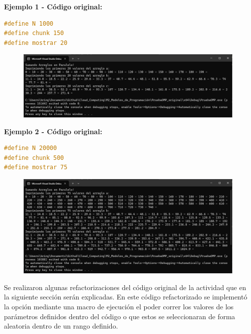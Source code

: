 \documentclass[12pt,a4paper]{article}
\begin{document}
\vspace{1em}

\textbf{Ejemplo 1 - Código original:}

\begin{lstlisting}[language=C, numbers=none]
#define N 1000
#define chunk 150
#define mostrar 20
\end{lstlisting}

\begin{figure}[H]
    \centering
    \includegraphics[width=1\linewidth]{M2_Modelos_de_Programación/reporte/figuras/Código_original_ejemplo-1.png}
    \label{fig:Código_original_ejemplo-1}
\end{figure}

\textbf{Ejemplo 2 - Código original:}

\begin{lstlisting}[language=C, numbers=none]
#define N 20000
#define chunk 500
#define mostrar 75
\end{lstlisting}

\begin{figure}[H]
    \centering
    \includegraphics[width=1\linewidth]{M2_Modelos_de_Programación/reporte/figuras/Código_original_ejemplo-2.png}
    \label{fig:Código_original_ejemplo-2}
\end{figure}

Se realizaron algunas refactorizaciones del código original de la actividad que en la siguiente sección serán explicadas. En este código refactorizado se implementó la opción mediante una macro de ejecución el poder correr los valores de los parámetros definidos dentro del código o que estos se seleccionaran de forma aleatoria dentro de un rango definido.
\end{document}
